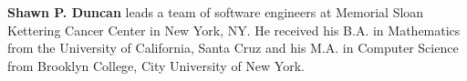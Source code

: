 \noindent \textbf{Shawn P. Duncan} leads a team of software engineers at Memorial Sloan Kettering Cancer Center in New York, NY. He received his B.A. in Mathematics from the University of California, Santa Cruz and his M.A. in Computer Science from Brooklyn College, City University of New York.
